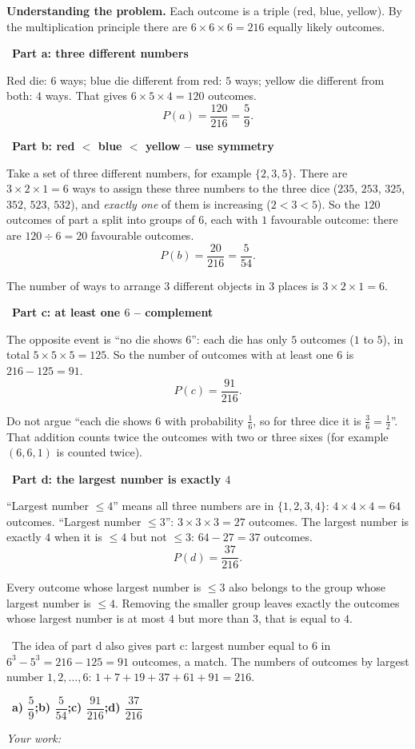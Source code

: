 \documentclass[11pt]{article}
\newif\ifsol \solfalse
\providecommand{\AnsWord}{Đáp số}
\newcommand{\StuProb}[2]{\begin{probboxS}{#1}{#2}\StuProbBody\end{probboxS}}
\newcommand{\ans}[1]{\par\smallskip{\bfseries\color{tmGreen!88!black}\AnsWord:}\ {\bfseries\color{AnsRed}#1}\par}
\newcommand{\probsol}[1]{%
  \begin{lrbox}{\solmeasure}\begin{minipage}{\dimexpr\linewidth-24pt\relax}#1\end{minipage}\end{lrbox}%
  \ifsol
    \begin{solbox}#1\end{solbox}%
  \else
    \setlength{\solht}{\dimexpr\ht\solmeasure+\dp\solmeasure+0.85cm\relax}%
    \ifdim\solht<1.35cm\setlength{\solht}{1.35cm}\fi
    \ifdim\solht>\StudentMaxWork\setlength{\solht}{\StudentMaxWork}\fi
    \par\noindent\begin{minipage}{\linewidth}%
    \expandafter\StuProb\StuProbArgs
    \begin{tcolorbox}[colback=white,colframe=Line,boxrule=0.8pt,arc=5pt,
      left=8pt,right=8pt,top=4pt,bottom=4pt,height=\solht]{\footnotesize\color{Slate}\itshape\WorkWord}\end{tcolorbox}%
    \end{minipage}\par\medskip
  \fi}
\newlength{\StudentMaxWork}\setlength{\StudentMaxWork}{4.5cm}
\newcommand{\step}[2]{\par\smallskip\noindent{\bfseries\color{tmBlue!85!black}\StepWord~#1.}\ {\bfseries #2}\par\nopagebreak}
\newcommand{\verify}[1]{\par\smallskip\noindent{\bfseries\color{tmGreen!80!black}\faCheckCircle\ \CheckWord}\ #1\par}
\def\WorkWord{Your work:}
\def\AnsWord{Answer}
\def\StepWord{Step}
\def\CheckWord{Check:}
\begin{document}
\probsol{
\textbf{Understanding the problem.} Each outcome is a triple (red, blue, yellow). By the multiplication principle there are
$6\times6\times6=216$ equally likely outcomes.

\step{1}{Part a: three different numbers}
Red die: $6$ ways; blue die different from red: $5$ ways; yellow die different from both: $4$ ways. That gives $6\times5\times4=120$ outcomes.
\[P(a)=\frac{120}{216}=\frac{5}{9}.\]

\step{2}{Part b: red $<$ blue $<$ yellow -- use symmetry}
Take a set of three different numbers, for example $\{2,3,5\}$. There are $3\times2\times1=6$ ways to assign these three numbers to the three
dice ($235$, $253$, $325$, $352$, $523$, $532$), and \emph{exactly one} of them is increasing ($2<3<5$).
So the $120$ outcomes of part a split into groups of $6$, each with $1$ favourable outcome: there are $120\div6=20$ favourable outcomes.
\[P(b)=\frac{20}{216}=\frac{5}{54}.\]
\begin{recallbox}The number of ways to arrange $3$ different objects in $3$ places is $3\times2\times1=6$.\end{recallbox}

\step{3}{Part c: at least one $6$ -- complement}
The opposite event is ``no die shows $6$'': each die has only $5$ outcomes ($1$ to $5$), in total $5\times5\times5=125$.
So the number of outcomes with at least one $6$ is $216-125=91$.
\[P(c)=\frac{91}{216}.\]
\begin{warnbox}Do not argue ``each die shows $6$ with probability $\frac16$, so for three dice it is $\frac36=\frac12$''. That addition counts
twice the outcomes with two or three sixes (for example $(6,6,1)$ is counted twice).\end{warnbox}

\step{4}{Part d: the largest number is exactly $4$}
``Largest number $\le4$'' means all three numbers are in $\{1,2,3,4\}$: $4\times4\times4=64$ outcomes.
``Largest number $\le3$'': $3\times3\times3=27$ outcomes. The largest number is exactly $4$ when it is $\le4$ but not $\le3$:
$64-27=37$ outcomes.
\[P(d)=\frac{37}{216}.\]
\begin{proofbox}Every outcome whose largest number is $\le3$ also belongs to the group whose largest number is $\le4$. Removing the smaller
group leaves exactly the outcomes whose largest number is at most $4$ but more than $3$, that is equal to $4$.\end{proofbox}
\verify{The idea of part d also gives part c: largest number equal to $6$ in $6^3-5^3=216-125=91$ outcomes, a match. The numbers of
outcomes by largest number $1,2,\dots,6$: $1+7+19+37+61+91=216$.}
\ans{a) $\dfrac59$;\quad b) $\dfrac5{54}$;\quad c) $\dfrac{91}{216}$;\quad d) $\dfrac{37}{216}$}
}
\end{document}
